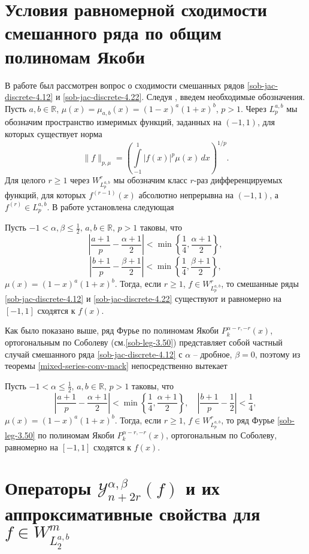 \section{Условия равномерной сходимости смешанного ряда по общим полиномам Якоби}

В работе  \cite{sob-jac-discrete-Shar17} был рассмотрен вопрос  о сходимости смешанных рядов \eqref{sob-jac-discrete-4.12}  и \eqref{sob-jac-discrete-4.22}. Следуя \cite{sob-jac-discrete-Shar17},
 введем необходимые обозначения. Пусть $a,b\in\mathbb{R}$, $\mu(x)=\mu_{a,b}(x)=(1-x)^a(1+x)^b$,
$p>1$. Через $L^{a,b}_p$ мы обозначим пространство измеримых
функций, заданных на $(-1,1)$, для которых существует норма
$$ \|f\|_{p,\mu}=\left(\int\limits^1_{-1}|f(x)|^p\mu(x)\,dx\right)^{1/p}. $$
Для целого $r\ge1$ через $W^r_{L^{a,b}_p}$ мы обозначим класс
$r$-раз дифференцируемых функций, для которых $f^{(r-1)}(x)$
абсолютно непрерывна на $(-1,1)$, а $f^{(r)}\in L^{a,b}_p$. В работе \cite{sob-jac-discrete-Shar18} установлена следующая
\begin{theorem}\label{mixed-series-conv-mack}
 Пусть
$-1<\alpha,\beta\le\frac{1}{2},\,a,b\in\mathbb{R},\,p>1$ таковы, что
$$\left|\frac{a+1}{p}-\frac{\alpha+1}{2}\right|<
\min\left\{\frac{1}{4},\frac{\alpha+1}{2}\right\},$$$$
\left|\frac{b+1}{p}-\frac{\beta+1}{2}\right|<\min\left\{\frac{1}{4},\frac{\beta+1}{2}\right\},
$$  $\mu(x)=(1-x)^a(1+x)^b$. Тогда, если $r\ge1$,
$f\in W^r_{L^{a,b}_p}$, то смешанные ряды \eqref{sob-jac-discrete-4.12}  и \eqref{sob-jac-discrete-4.22} существуют
и равномерно на $[-1,1]$ сходятся к $f(x)$.
\end{theorem}
Как было показано выше, ряд Фурье  по полиномам Якоби $P_{k}^{\alpha-r,-r}(x)$, ортогональным по Соболеву (см.\eqref{sob-leg-3.50})  представляет собой частный случай смешанного ряда \eqref{sob-jac-discrete-4.12} с $\alpha$ -- дробное, $\beta=0$, поэтому из теоремы \ref{mixed-series-conv-mack} непосредственно вытекает
\begin{corollary}
  Пусть
$-1<\alpha\le\frac{1}{2},\,a,b\in\mathbb{R},\,p>1$ таковы, что
$$\left|\frac{a+1}{p}-\frac{\alpha+1}{2}\right|<
\min\left\{\frac{1}{4},\frac{\alpha+1}{2}\right\},\quad
\left|\frac{b+1}{p}-\frac{1}{2}\right|<\frac{1}{4},
$$
 $\mu(x)=(1-x)^a(1+x)^b$. Тогда, если $r\ge1$, $f\in W^r_{L^{a,b}_p}$, то  ряд Фурье \eqref{sob-leg-3.50} по полиномам Якоби $P_{k}^{\alpha-r,-r}(x)$, ортогональным по Соболеву,  равномерно на $[-1,1]$ сходятся к $f(x)$.
\end{corollary}

\section{ Операторы $\mathcal{Y}_{n+2r}^{\alpha, \beta}(f)$ и их аппроксимативные свойства для $f\in W^m_{L^{a,b}_2}$}

